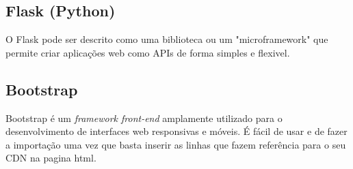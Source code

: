 \subsection{Flask (Python)}

O Flask pode ser descrito como uma biblioteca ou um "microframework" que permite 
criar aplicações web como APIs de forma simples e flexivel.


\subsection{Bootstrap}

Bootstrap é um \textit{framework front-end} amplamente utilizado para o desenvolvimento 
de interfaces web responsivas e móveis.
É fácil de usar e de fazer a importação uma vez que basta inserir as linhas que
fazem referência para o seu CDN na pagina html.



